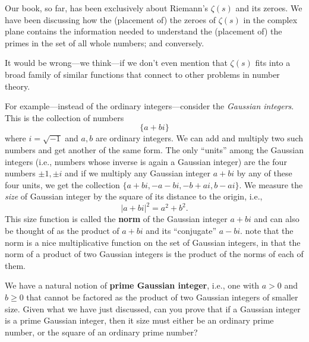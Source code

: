 \documentclass[openany]{book}
\theoremstyle{plain}
\theoremstyle{definition}
\begin{document}
{{Our book, so far, has been exclusively about Riemann's $\zeta(s)$ and
its zeroes. We have been discussing how the (placement of) the zeroes
of $\zeta(s)$ in the complex plane contains the information needed to
understand the (placement of) the primes in the set of all whole
numbers; and conversely.

It would be wrong---we think---if we don't even mention that
$\zeta(s)$ fits into a broad family of similar functions that connect to other problems in number theory.



For example---instead of the ordinary integers---consider the {\it
  Gaussian integers}. This is the collection of numbers
 $$ \{ a+bi\}$$
 where $i = {\sqrt{-1}}$ and $a,b$ are ordinary integers. We can add
 and multiply two such numbers and get another of the same form. The
 only ``units'' among the Gaussian integers (i.e., numbers whose
 inverse is again a Gaussian integer) are the four numbers $\pm 1, \pm
 i$ and if we multiply any Gaussian integer $a+bi$ by any of these
 four units, we get the collection $\{a+bi, -a-bi, -b+ai, b -ai\}$.
 We measure the {\it size} of Gaussian integer by the square of its
 distance to the origin, i.e., $$|a+bi|^2 = {a^2+b^2}.$$   This size function  is called the {\bf norm} of the Gaussian integer $a+bi$ and can also be thought of as  the product of $a+bi$ and its ``conjugate'' $a-bi$.   note that
 the norm is a nice multiplicative function on the set of Gaussian
 integers, in that the norm of a product of two Gaussian integers is
 the product of the norms of each of them.

 We have a natural notion of {\bf prime Gaussian integer}, i.e., one
 with $a>0$ and $b\geq 0$ that cannot be factored as the product of
 two Gaussian integers of smaller size.  Given what we have just
 discussed, can you prove that if a Gaussian integer is a prime
 Gaussian integer, then it size must either be an ordinary prime
 number, or the square of an ordinary prime number?

}}
\end{document}
